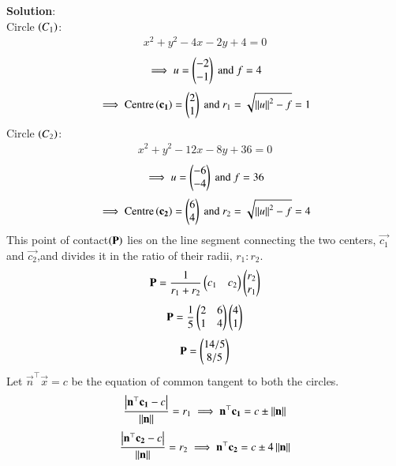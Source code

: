 \documentclass[journal]{IEEEtran}
\begin{document}
\textbf{Solution}:\\
Circle $\left(C_1\right)$:
\begin{align}
    x^2+y^2-4x-2y+4=0
\end{align}
\begin{align}
    \implies u=\begin{pmatrix}-2\\-1\end{pmatrix}\text{ and }f=4  
\end{align}
\begin{align}
    \implies \text{Centre}\left(\mathbf{c_1}\right) = \begin{pmatrix}2\\1\end{pmatrix} \text{ and } r_1=\sqrt{\left\lVert u\right\rVert^2-f}=1
\end{align}
Circle $\left(C_2\right)$:
\begin{align}
    x^2+y^2-12x-8y+36=0
\end{align}
\begin{align}
    \implies u=\begin{pmatrix}-6\\-4\end{pmatrix}\text{ and }f=36  
\end{align}
\begin{align}
    \implies \text{Centre}\left(\mathbf{c_2}\right) = \begin{pmatrix}6\\4\end{pmatrix} \text{ and } r_2=\sqrt{\left\lVert u\right\rVert^2-f}=4
\end{align}
This point of contact$\left(\mathbf{P}\right)$ lies on the line segment connecting the two centers, $\vec{c_1}$ and $\vec{c_2}$,and divides it in the ratio of their radii, $r_1:r_2$.
\begin{align}
    \mathbf{P} = \frac{1}{r_1+r_2}\begin{pmatrix}c_1 & c_2\end{pmatrix}\begin{pmatrix}r_2\\r_1\end{pmatrix}
\end{align}
\begin{align}
    \mathbf{P} = \frac{1}{5}\begin{pmatrix}2 & 6\\1 & 4\end{pmatrix}\begin{pmatrix}4\\1\end{pmatrix}
\end{align}
\begin{align}
    \mathbf{P} = \begin{pmatrix}14/5\\8/5\end{pmatrix}
\end{align}
Let $\vec{n}^\top \vec{x}=c$ be the equation of common tangent to both the circles.\\
\begin{align}
    \frac{\left\vert\mathbf{n}^\top\mathbf{c_1}-c\right\vert}{\left\lVert\mathbf{n}\right\rVert} = r_1\implies \mathbf{n}^\top\mathbf{c_1} = c\pm\left\lVert\mathbf{n}\right\rVert
\end{align}
\begin{align}
    \frac{\left\vert\mathbf{n}^\top\mathbf{c_2}-c\right\vert}{\left\lVert\mathbf{n}\right\rVert} = r_2\implies \mathbf{n}^\top\mathbf{c_2} = c\pm4\left\lVert\mathbf{n}\right\rVert
\end{align}
\end{document}
